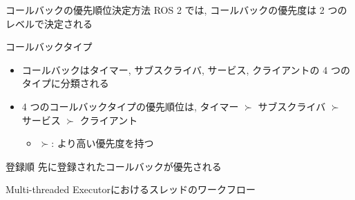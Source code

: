 \begin{frame}{コールバックの優先順位決定方法}
    ROS 2 では, コールバックの優先度は 2 つのレベルで決定される

    \begin{block}{コールバックタイプ}
        \setlength{\linewidth}{0.98\columnwidth}
        \begin{itemize}
            \item コールバックはタイマー, サブスクライバ, サービス, クライアントの 4 つのタイプに分類される
            \item 4 つのコールバックタイプの優先順位は, タイマー $\succ$ サブスクライバ $\succ$ サービス $\succ$ クライアント
                  \begin{itemize}
                      \item $\succ$: より高い優先度を持つ
                  \end{itemize}
        \end{itemize}
    \end{block}

    \begin{block}{登録順}
        先に登録されたコールバックが優先される
    \end{block}
\end{frame}

\begin{frame}{}
\end{frame}


\begin{frame}{Multi-threaded Executorにおけるスレッドのワークフロー}
    \begin{columns}
        \begin{column}{0.55\textwidth}
        \end{column}
        \begin{column}{0.45\textwidth}
        \end{column}
    \end{columns}
\end{frame}

